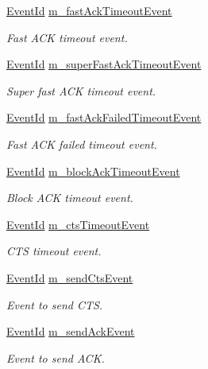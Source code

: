 \begin{DoxyCompactItemize}
\hyperlink{classns3_1_1EventId}{Event\+Id} \hyperlink{classns3_1_1MacLow_a0340164f4b7e73f93bcd618d238cd54c}{m\+\_\+fast\+Ack\+Timeout\+Event}
\begin{DoxyCompactList}\small\item\em Fast A\+CK timeout event. \end{DoxyCompactList}\item 
\hyperlink{classns3_1_1EventId}{Event\+Id} \hyperlink{classns3_1_1MacLow_ae2473406a32bcd2bd581a57da4683b18}{m\+\_\+super\+Fast\+Ack\+Timeout\+Event}
\begin{DoxyCompactList}\small\item\em Super fast A\+CK timeout event. \end{DoxyCompactList}\item 
\hyperlink{classns3_1_1EventId}{Event\+Id} \hyperlink{classns3_1_1MacLow_af34b1f498e3b5a25a62fd4bf5f6f943a}{m\+\_\+fast\+Ack\+Failed\+Timeout\+Event}
\begin{DoxyCompactList}\small\item\em Fast A\+CK failed timeout event. \end{DoxyCompactList}\item 
\hyperlink{classns3_1_1EventId}{Event\+Id} \hyperlink{classns3_1_1MacLow_ab45f8207ce750633a91b40aa3227f436}{m\+\_\+block\+Ack\+Timeout\+Event}
\begin{DoxyCompactList}\small\item\em Block A\+CK timeout event. \end{DoxyCompactList}\item 
\hyperlink{classns3_1_1EventId}{Event\+Id} \hyperlink{classns3_1_1MacLow_a1de3cc66dcaa9f318fb1b2cffb108b01}{m\+\_\+cts\+Timeout\+Event}
\begin{DoxyCompactList}\small\item\em C\+TS timeout event. \end{DoxyCompactList}\item 
\hyperlink{classns3_1_1EventId}{Event\+Id} \hyperlink{classns3_1_1MacLow_ade35698702b1353f2eff6b97653f8b0e}{m\+\_\+send\+Cts\+Event}
\begin{DoxyCompactList}\small\item\em Event to send C\+TS. \end{DoxyCompactList}\item 
\hyperlink{classns3_1_1EventId}{Event\+Id} \hyperlink{classns3_1_1MacLow_a35ee7cfc983896c26c514bade14b3197}{m\+\_\+send\+Ack\+Event}
\begin{DoxyCompactList}\small\item\em Event to send A\+CK. \end{DoxyCompactList}\item 

\end{DoxyCompactItemize}
